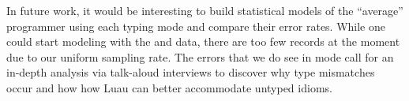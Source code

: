 \documentclass[english,submission,cleveref]{programming}
\begin{document}
In future work, it would be interesting to build statistical models of
the ``average'' programmer using each typing mode and compare their error
rates.
While one could start modeling with the \mnocheck{} and \mnonstrict{}
data, there are too few \mstrict{} records at the moment due to our uniform
sampling rate.
The errors that we do see in \mstrict{} mode call for an in-depth analysis via
talk-aloud interviews to discover why type mismatches occur and how how Luau
can better accommodate untyped idioms.






%
%
%
%
%
%

\newpage


\end{document}
